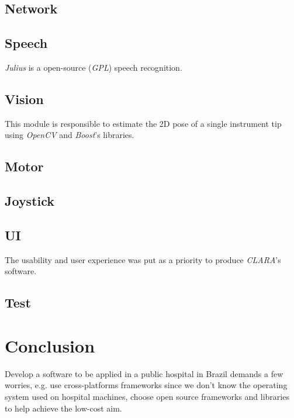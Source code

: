 \documentclass{svproc}
\begin{document}
\begin{multicols}{2}
		
	\subsection{Network}
		
	\subsection{Speech}
	
	\textit{Julius}\cite{lee2009recent} is a open-source (\textit{GPL}\cite{gpl}) speech recognition.
	
	\subsection{Vision}
	
	This module is responsible to estimate the 2D pose of a single instrument tip\cite{vision} using \textit{OpenCV} and \textit{Boost}'s libraries.
	
	\subsection{Motor}
	
	\subsection{Joystick}
	
	\subsection{UI}
	
	The usability and user experience was put as a priority to produce \textit{CLARA}'s software. 
	
	
	\subsection{Test}
	
	\section{Conclusion}

	Develop a software to be applied in a public hospital in Brazil demands a few worries, e.g. use cross-platforms frameworks since we don't know the operating system used on hospital machines, choose open source frameworks and libraries to help achieve the low-cost aim.
	

\end{multicols}
\end{document}
